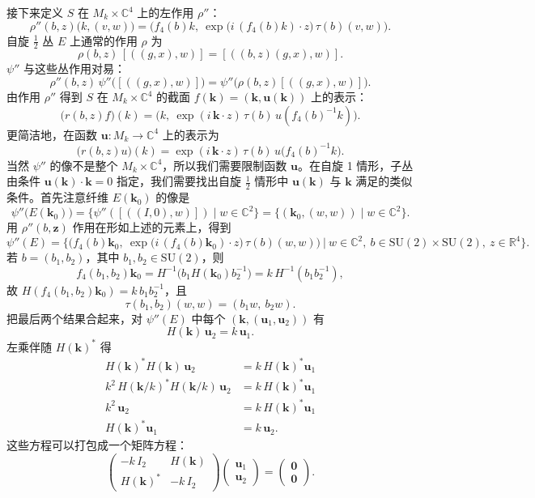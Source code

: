 接下来定义 $S$ 在 $M_k\times\mathbb{C}^4$ 上的左作用 $\rho''$：
\[
\rho''(b,z)\big(k,(v,w)\big)=\big(f_4(b)k,\ \exp\big(i\,(f_4(b)k)\cdot z\big)\,\tau(b)(v,w)\big).
\]
自旋 $\tfrac12$ 丛 $E$ 上通常的作用 $\rho$ 为
\[
\rho(b,z)\,[((g,x),w)]=[((b,z)(g,x),w)].
\]
$\psi''$ 与这些丛作用对易：
\[
\rho''(b,z)\,\psi''\big([((g,x),w)]\big)=\psi''\big(\rho(b,z)[((g,x),w)]\big).
\]
由作用 $\rho''$ 得到 $S$ 在 $M_k\times\mathbb{C}^4$ 的截面 $f(\mathbf{k})=(\mathbf{k},\mathbf{u}(\mathbf{k}))$ 上的表示：
\[
\big(r(b,z)f\big)(k)=\big(k,\ \exp(i\,\mathbf{k}\cdot z)\,\tau(b)\,u(f_4(b)^{-1}k)\big).
\]
更简洁地，在函数 $\mathbf{u}:M_k\to\mathbb{C}^4$ 上的表示为
\begin{equation}
\big(r(b,z)u\big)(k)=\exp(i\,\mathbf{k}\cdot z)\,\tau(b)\,u\big(f_4(b)^{-1}k\big). \tag{4.2.7}
\end{equation}
当然 $\psi''$ 的像不是整个 $M_k\times\mathbb{C}^4$，所以我们需要限制函数 $\mathbf{u}$。在自旋 1 情形，子丛由条件 $\mathbf{u}(\mathbf{k})\cdot\mathbf{k}=0$ 指定，我们需要找出自旋 $\tfrac12$ 情形中 $\mathbf{u}(\mathbf{k})$ 与 $\mathbf{k}$ 满足的类似条件。首先注意纤维 $E(\mathbf{k}_0)$ 的像是
\[
\psi''\big(E(\mathbf{k}_0)\big)=\{\psi''([((I,0),w)])\mid w\in\mathbb{C}^2\}=\{(\mathbf{k}_0,(w,w))\mid w\in\mathbb{C}^2\}.
\]
用 $\rho''(b,\mathbf{z})$ 作用在形如上述的元素上，得到
\[
\psi''(E)=\Big\{\Big(f_4(b)\mathbf{k}_0,\ \exp\big(i\,(f_4(b)\mathbf{k}_0)\cdot z\big)\,\tau(b)(w,w)\Big)\ \Big|\ w\in\mathbb{C}^2,\ b\in\mathrm{SU}(2)\times\mathrm{SU}(2),\ z\in\mathbb{R}^4\Big\}.
\]
若 $b=(b_1,b_2)$，其中 $b_1,b_2\in\mathrm{SU}(2)$，则
\[
f_4(b_1,b_2)\mathbf{k}_0=H^{-1}\big(b_1 H(\mathbf{k}_0)b_2^{-1}\big)=k\,H^{-1}(b_1 b_2^{-1}),
\]
故 $H(f_4(b_1,b_2)\mathbf{k}_0)=k\,b_1 b_2^{-1}$，且
\[
\tau(b_1,b_2)(w,w)=(b_1 w,\ b_2 w).
\]
把最后两个结果合起来，对 $\psi''(E)$ 中每个 $(\mathbf{k},(\mathbf{u}_1,\mathbf{u}_2))$ 有
\[
H(\mathbf{k})\,\mathbf{u}_2=k\,\mathbf{u}_1 .
\]
左乘伴随 $H(\mathbf{k})^*$ 得
\begin{align*}
H(\mathbf{k})^* H(\mathbf{k})\,\mathbf{u}_2&=k\,H(\mathbf{k})^*\mathbf{u}_1\\
k^2\,H(\mathbf{k}/k)^* H(\mathbf{k}/k)\,\mathbf{u}_2&=k\,H(\mathbf{k})^*\mathbf{u}_1\\
k^2\,\mathbf{u}_2&=k\,H(\mathbf{k})^*\mathbf{u}_1\\
H(\mathbf{k})^*\mathbf{u}_1&=k\,\mathbf{u}_2 .
\end{align*}
这些方程可以打包成一个矩阵方程：
\[
\begin{pmatrix}-k\,I_2 & H(\mathbf{k})\\ H(\mathbf{k})^* & -k\,I_2\end{pmatrix}
\begin{pmatrix}\mathbf{u}_1\\ \mathbf{u}_2\end{pmatrix}
=\begin{pmatrix}\mathbf{0}\\ \mathbf{0}\end{pmatrix}.
\]
